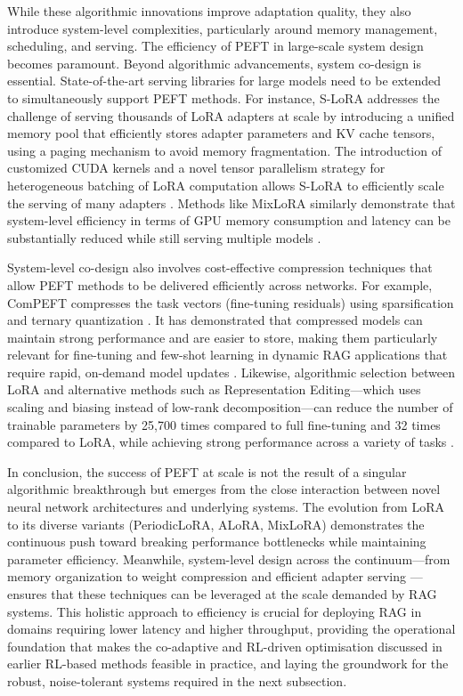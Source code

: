 \documentclass[11pt]{article}
\begin{document}
While these algorithmic innovations improve adaptation quality, they also introduce system-level complexities, particularly around memory management, scheduling, and serving. The efficiency of PEFT in large-scale system design becomes paramount. Beyond algorithmic advancements, system co-design is essential. State-of-the-art serving libraries for large models need to be extended to simultaneously support PEFT methods. For instance, S-LoRA addresses the challenge of serving thousands of LoRA adapters at scale by introducing a unified memory pool that efficiently stores adapter parameters and KV cache tensors, using a paging mechanism to avoid memory fragmentation. The introduction of customized CUDA kernels and a novel tensor parallelism strategy for heterogeneous batching of LoRA computation allows S-LoRA to efficiently scale the serving of many adapters \cite{ref95}. Methods like MixLoRA similarly demonstrate that system-level efficiency in terms of GPU memory consumption and latency can be substantially reduced while still serving multiple models \cite{ref92}.

System-level co-design also involves cost-effective compression techniques that allow PEFT methods to be delivered efficiently across networks. For example, ComPEFT compresses the task vectors (fine-tuning residuals) using sparsification and ternary quantization \cite{ref88}. It has demonstrated that compressed models can maintain strong performance and are easier to store, making them particularly relevant for fine-tuning and few-shot learning in dynamic RAG applications that require rapid, on-demand model updates \cite{ref88}. Likewise, algorithmic selection between LoRA and alternative methods such as Representation Editing---which uses scaling and biasing instead of low-rank decomposition---can reduce the number of trainable parameters by 25,700 times compared to full fine-tuning and 32 times compared to LoRA, while achieving strong performance across a variety of tasks \cite{ref96}.

In conclusion, the success of PEFT at scale is not the result of a singular algorithmic breakthrough but emerges from the close interaction between novel neural network architectures and underlying systems. The evolution from LoRA to its diverse variants (PeriodicLoRA, ALoRA, MixLoRA) demonstrates the continuous push toward breaking performance bottlenecks while maintaining parameter efficiency. Meanwhile, system-level design across the continuum---from memory organization \cite{ref95} to weight compression \cite{ref88} and efficient adapter serving \cite{ref92}---ensures that these techniques can be leveraged at the scale demanded by RAG systems. This holistic approach to efficiency is crucial for deploying RAG in domains requiring lower latency and higher throughput, providing the operational foundation that makes the co-adaptive and RL-driven optimisation discussed in earlier RL-based methods feasible in practice, and laying the groundwork for the robust, noise-tolerant systems required in the next subsection.
\end{document}
